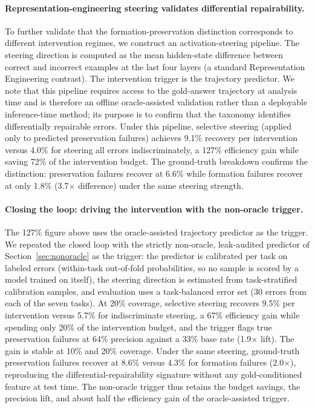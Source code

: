 \documentclass{article} %
\begin{document}
\paragraph{Representation-engineering steering validates differential repairability.}
To further validate that the formation-preservation distinction corresponds to different intervention regimes, we construct an activation-steering pipeline. The steering direction is computed as the mean hidden-state difference between correct and incorrect examples at the last four layers (a standard Representation Engineering contrast). The intervention trigger is the trajectory predictor. We note that this pipeline requires access to the gold-answer trajectory at analysis time and is therefore an offline oracle-assisted validation rather than a deployable inference-time method; its purpose is to confirm that the taxonomy identifies differentially repairable errors. Under this pipeline, selective steering (applied only to predicted preservation failures) achieves 9.1\% recovery per intervention versus 4.0\% for steering all errors indiscriminately, a 127\% efficiency gain while saving 72\% of the intervention budget. The ground-truth breakdown confirms the distinction: preservation failures recover at 6.6\% while formation failures recover at only 1.8\% (3.7$\times$ difference) under the same steering strength.

\paragraph{Closing the loop: driving the intervention with the non-oracle trigger.}
The 127\% figure above uses the oracle-assisted trajectory predictor as the trigger. We repeated the closed loop with the strictly non-oracle, leak-audited predictor of Section~\ref{sec:nonoracle} as the trigger: the predictor is calibrated per task on labeled errors (within-task out-of-fold probabilities, so no sample is scored by a model trained on itself), the steering direction is estimated from task-stratified calibration samples, and evaluation uses a task-balanced error set (30 errors from each of the seven tasks). At 20\% coverage, selective steering recovers 9.5\% per intervention versus 5.7\% for indiscriminate steering, a 67\% efficiency gain while spending only 20\% of the intervention budget, and the trigger flags true preservation failures at 64\% precision against a 33\% base rate (1.9$\times$ lift). The gain is stable at 10\% and 20\% coverage. Under the same steering, ground-truth preservation failures recover at 8.6\% versus 4.3\% for formation failures (2.0$\times$), reproducing the differential-repairability signature without any gold-conditioned feature at test time. The non-oracle trigger thus retains the budget savings, the precision lift, and about half the efficiency gain of the oracle-assisted trigger.
\end{document}
